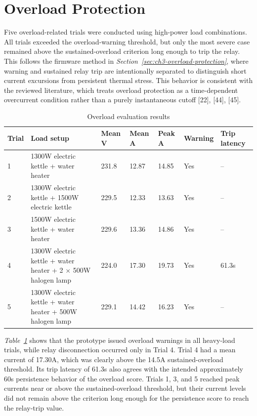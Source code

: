\section{Overload Protection}
\label{sec:ch4-overload-protection}

Five overload-related trials were conducted using high-power load combinations.
All trials exceeded the overload-warning threshold, but only the most severe
case remained above the sustained-overload criterion long enough to trip the
relay. This follows the firmware method in
\textit{Section~\ref{sec:ch3-overload-protection}}, where warning and sustained relay
trip are intentionally separated to distinguish short current excursions from
persistent thermal stress. This behavior is consistent with the reviewed
literature, which treats overload protection as a time-dependent overcurrent
condition rather than a purely instantaneous cutoff [22], [44], [45].

\begin{table}[H]
  \centering
  \caption{Overload evaluation results}
  \label{tab:ch4-overload-evaluation}
  \footnotesize
  \setlength{\tabcolsep}{3pt}
  \begin{tabular}{@{}p{}p{}p{}p{}p{}p{}p{}@{}}
    \toprule
    \textbf{Trial} & \textbf{Load setup} & \textbf{Mean V} & \textbf{Mean A} & \textbf{Peak A} & \textbf{Warning} & \textbf{Trip latency} \\
    \midrule
    1 & 1300W electric kettle + water heater & 231.8 & 12.87 & 14.85 & Yes & -- \\
    2 & 1300W electric kettle + 1500W electric kettle & 229.5 & 12.33 & 13.63 & Yes & -- \\
    3 & 1500W electric kettle + water heater & 229.6 & 13.36 & 14.86 & Yes & -- \\
    4 & 1300W electric kettle + water heater + 2 $\times$ 500W halogen lamp & 224.0 & 17.30 & 19.73 & Yes & 61.3s \\
    5 & 1300W electric kettle + water heater + 500W halogen lamp & 229.1 & 14.42 & 16.23 & Yes & -- \\
    \bottomrule
  \end{tabular}
\end{table}

\textit{Table~\ref{tab:ch4-overload-evaluation}} shows that the prototype
issued overload warnings in all heavy-load trials, while relay disconnection
occurred only in Trial 4. Trial 4 had a mean current of 17.30A, which was
clearly above the 14.5A sustained-overload threshold. Its trip latency of 61.3s
also agrees with the intended approximately 60s persistence behavior of the
overload score. Trials 1, 3, and 5 reached peak currents near or above the
sustained-overload threshold, but their current levels did not remain above the
criterion long enough for the persistence score to reach the relay-trip value.

